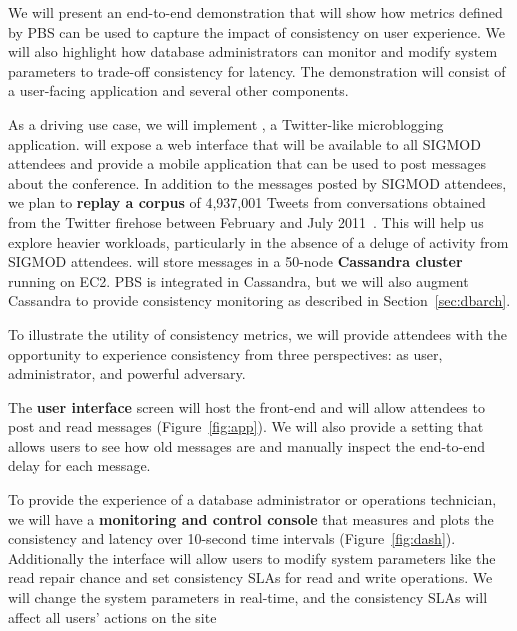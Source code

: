 We will present an end-to-end demonstration that will show how metrics
defined by PBS can be used to capture the impact of consistency on
user experience. We will also highlight how database administrators
can monitor and modify system parameters to trade-off consistency for
latency. The demonstration will consist of a user-facing application and 
several other components.


As a driving use case, we will implement \textbf{{\systemname}}, a
Twitter-like microblogging application. {\systemname} will expose a web
interface that will be available to all SIGMOD attendees and provide a
mobile application that can be used to post messages about the
conference. In addition to the messages posted by SIGMOD attendees, we
plan to \textbf{replay a corpus} of 4,937,001 Tweets from
conversations obtained from the Twitter firehose between February and
July 2011~\cite{ritter2010unsupervised}. This will help us explore
heavier workloads, particularly in the absence of a deluge of activity
from SIGMOD attendees. {\systemname} will store messages in a 50-node
\textbf{Cassandra cluster} running on EC2. PBS is integrated in
Cassandra, but we will also augment Cassandra to provide consistency
monitoring as described in Section~\ref{sec:dbarch}.


To illustrate the utility of consistency metrics, we will provide
attendees with the opportunity to experience consistency from three
perspectives: as user, administrator, and powerful adversary.

The \textbf{user interface} screen will host the {\systemname}
front-end and will allow attendees to post and read messages
(Figure~\ref{fig:app}). We will also provide a setting that
allows users to see how old messages are and manually inspect the
end-to-end delay for each message. %

To provide the experience of a database administrator or operations
technician, we will have a \textbf{monitoring and control console}
that measures and plots the consistency and latency over 10-second
time intervals (Figure~\ref{fig:dash}).
Additionally the interface will allow users to modify system parameters like
the read repair chance and set consistency SLAs for read and write
operations. We will change the system parameters in real-time, and the
consistency SLAs will affect all users' actions on the site

